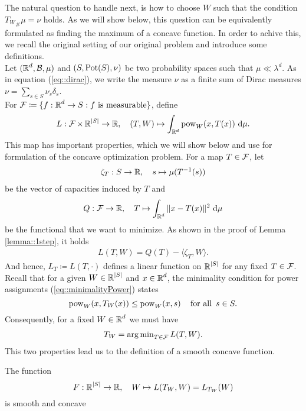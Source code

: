 \documentclass[
     12pt,         %
     a4paper,      %
     BCOR=10mm,     %
     DIV=14,        %
     ]{scrreprt}
\begin{document}
    The natural question to handle next, is how to choose $W$ such that the condition ${T_{W}}_{\#}\mu = \nu$ holds. As we will show below, this question can be equivalently formulated
    as finding the maximum of a concave function. In order to achive this, we recall the original setting of our original problem and introduce some definitions. \\[8pt]
    \indent Let $(\operatorname{\mathbb{R}}^d, \operatorname{\mathcal{B}}, \mu)$ and $(S, \operatorname{Pot}(S), \nu)$ be two probability spaces such that $\mu \ll \lambda^d$. As in equation (\ref{eq::dirac}), we write the measure $\nu$ as 
    a finite sum of Dirac measures $\nu = \sum_{s\in S} {\nu_s \delta_{s}} $. \\
    For $\operatorname{\mathcal{F}} \coloneqq \{ f: \operatorname{\mathbb{R}}^d \to S : f \text{ is measurable}\}$, define
    \[L: \operatorname{\mathcal{F}} \times \operatorname{\mathbb{R}}^{|S|} \to \operatorname{\mathbb{R}}, \quad (T,W) \mapsto \int_{\operatorname{\mathbb{R}}^d} \operatorname{pow}_W(x,T(x)) \ {\operatorname{{\mathrm{d}}}} \mu. \]
    This map has important properties, which we will show below and use for formulation of the concave optimization problem. For a map $T\in \operatorname{\mathcal{F}}$, let 
    \begin{align} \label{eq::defzeta}
         \zeta_T : S \to \operatorname{\mathbb{R}}, \quad s\mapsto \mu(T^{-1}(s))
    \end{align}
    be the vector of capacities induced by $T$ and 
    \[Q: \operatorname{\mathcal{F}} \to \operatorname{\mathbb{R}}, \quad T \mapsto \int_{\operatorname{\mathbb{R}}^d} \|x-T(x)\|^2 \ {\operatorname{{\mathrm{d}}}} \mu \]
    be the functional that we want to minimize. As shown in the proof of Lemma \ref{lemma::1step}, it holds
    \begin{align} \label{eq::defL}
        L(T,W) = Q(T) - \langle \zeta_T, W \rangle.
    \end{align}
    And hence, $L_T \coloneqq L(T, \cdot)$ defines a linear function on $\operatorname{\mathbb{R}}^{|S|}$ for any fixed $T \in \operatorname{\mathcal{F}}$. \\[8pt]
    \indent Recall that for a given $W \in \operatorname{\mathbb{R}}^{|S|}$ and $x\in \operatorname{\mathbb{R}}^d$, the minimality condition for power assignments (\ref{eq::minimalityPower}) states
    \[\pow_W(x,T_W(x)) \le \pow_W(x,s) \quad \forAll s \in S.\]
    Consequently, for a fixed $W \in \operatorname{\mathbb{R}}^d$ we must have 
    \begin{align} \label{eq:propTW}
        T_W = \operatorname{arg\,min}_{T\in \operatorname{\mathcal{F}}} L(T,W).
    \end{align}
    This two properties lead us to the definition of a smooth concave function.
    \begin{thm}\label{thm::concaveMin}
        The function \[ F : \operatorname{\mathbb{R}}^{|S|} \to \operatorname{\mathbb{R}}, \quad W \mapsto L(T_W, W) = L_{T_W}(W) \]
        is smooth and concave
    \end{thm}
\end{document}
